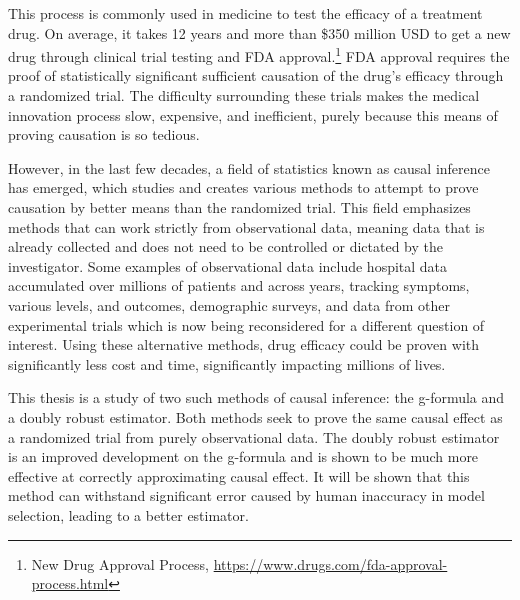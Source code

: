 This process is commonly used in medicine to test the efficacy of a treatment drug.  On average, it takes 12 years and more than \$350 million USD to get a new drug through clinical trial testing and FDA approval.\footnote{New Drug Approval Process, \url{https://www.drugs.com/fda-approval-process.html}}  FDA approval requires the proof of statistically significant sufficient causation of the drug's efficacy through a randomized trial.  The difficulty surrounding these trials makes the medical innovation process slow, expensive, and inefficient, purely because this means of proving causation is so tedious.  
 
However, in the last few decades, a field of statistics known as causal inference has emerged, which studies and creates various methods to attempt to prove causation by better means than the randomized trial.  This field emphasizes methods that can work strictly from observational data, meaning data that is already collected and does not need to be controlled or dictated by the investigator.  Some examples of observational data include hospital data accumulated over millions of patients and across years, tracking symptoms, various levels, and outcomes, demographic surveys, and data from other experimental trials which is now being reconsidered for a different question of interest.  Using these alternative methods, drug efficacy could be proven with significantly less cost and time, significantly impacting millions of lives.  

This thesis is a study of two such methods of causal inference: the g-formula and a doubly robust estimator.  Both methods seek to prove the same causal effect as a randomized trial from purely observational data.  The doubly robust estimator is an improved development on the g-formula and is shown to be much more effective at correctly approximating causal effect.  It will be shown that this method can withstand significant error caused by human inaccuracy in model selection, leading to a better estimator.  



